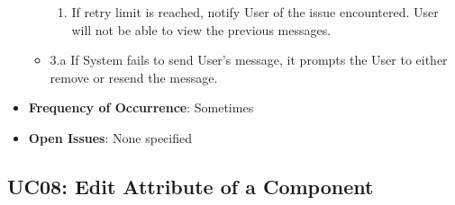 \documentclass[12pt]{article}
\begin{document}
\begin{itemize}
\begin{itemize}
            \begin{enumerate}
                \item If retry limit is reached, notify User of the issue encountered. User will not be able to view the previous messages.
            \end{enumerate}
            \item 3.a If System fails to send User's message, it prompts the User to either remove or resend the message.
        \end{itemize}
        \item \textbf{Frequency of Occurrence}: Sometimes
        \item \textbf{Open Issues}: None specified
    \end{itemize}

    \subsection{UC08: Edit Attribute of a Component}
\end{document}
